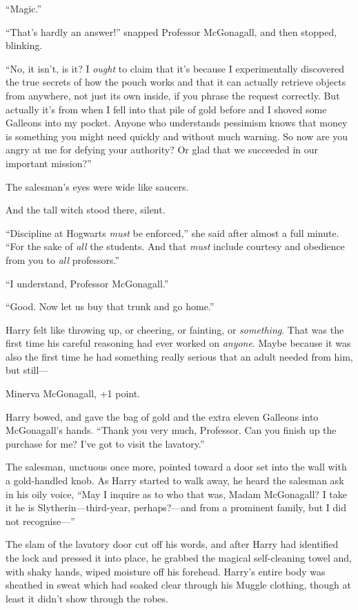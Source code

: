 ``Magic.''

``That's hardly an answer!'' snapped Professor McGonagall, and then
stopped, blinking.

``No, it isn't, is it? I \emph{ought} to claim that it's because I
experimentally discovered the true secrets of how the pouch works and
that it can actually retrieve objects from anywhere, not just its own
inside, if you phrase the request correctly. But actually it's from when
I fell into that pile of gold before and I shoved some Galleons into my
pocket. Anyone who understands pessimism knows that money is something
you might need quickly and without much warning. So now are you angry at
me for defying your authority? Or glad that we succeeded in our
important mission?''

The salesman's eyes were wide like saucers.

And the tall witch stood there, silent.

``Discipline at Hogwarts \emph{must} be enforced,'' she said after
almost a full minute. ``For the sake of \emph{all} the students. And
that \emph{must} include courtesy and obedience from you to \emph{all}
professors.''

``I understand, Professor McGonagall.''

``Good. Now let us buy that trunk and go home.''

Harry felt like throwing up, or cheering, or fainting, or
\emph{something}. That was the first time his careful reasoning had ever
worked on \emph{anyone}. Maybe because it was also the first time he had
something really serious that an adult needed from him, but still---

Minerva McGonagall, +1 point.

Harry bowed, and gave the bag of gold and the extra eleven Galleons into
McGonagall's hands. ``Thank you very much, Professor. Can you finish up
the purchase for me? I've got to visit the lavatory.''

The salesman, unctuous once more, pointed toward a door set into the
wall with a gold-handled knob. As Harry started to walk away, he heard
the salesman ask in his oily voice, ``May I inquire as to who that was,
Madam McGonagall? I take it he is Slytherin---third-year, perhaps?---and
from a prominent family, but I did not recognise---''

The slam of the lavatory door cut off his words, and after Harry had
identified the lock and pressed it into place, he grabbed the magical
self-cleaning towel and, with shaky hands, wiped moisture off his
forehead. Harry's entire body was sheathed in sweat which had soaked
clear through his Muggle clothing, though at least it didn't show
through the robes.

